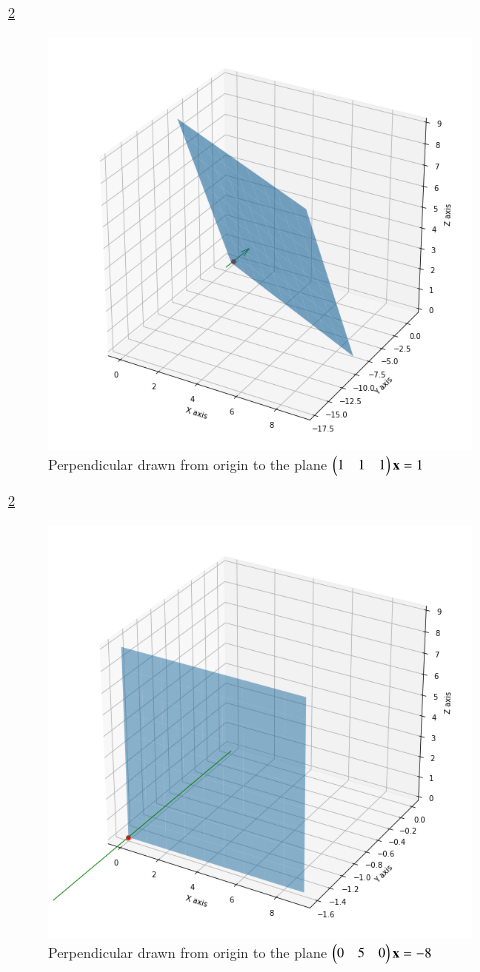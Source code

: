 \documentclass[journal,12pt,twocolumn]{IEEEtran}
\begin{document}
\ref{myfig}
\renewcommand{\thefigure}{b}
\begin{figure}[h!]
    \centering
    \includegraphics[width=\columnwidth]{plane3.png}
    \caption{Perpendicular drawn from origin to the plane $\begin{pmatrix}1&1&1\end{pmatrix}\mathbf{x} = 1$}
    \label{myfig}
\end{figure}
\ref{myfig}
\renewcommand{\thefigure}{b}
\begin{figure}[h!]
    \centering
    \includegraphics[width=\columnwidth]{plane4.png}
    \caption{Perpendicular drawn from origin to the plane $\begin{pmatrix}0&5&0\end{pmatrix}\mathbf{x} = -8$}
    \label{myfig}
\end{figure}
\end{document}
